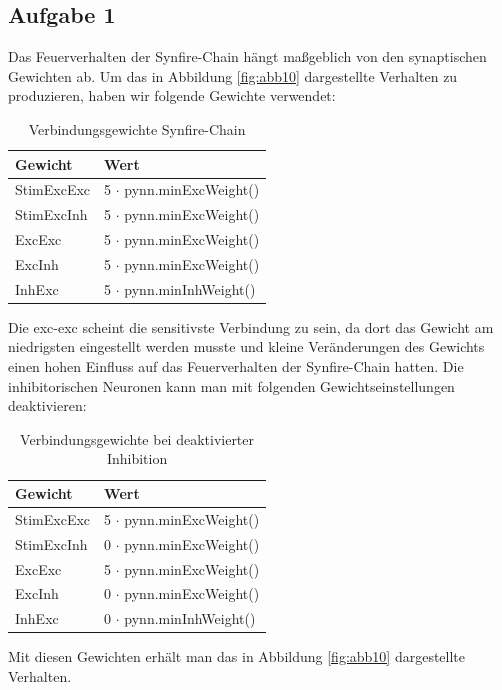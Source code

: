 \documentclass[10pt,a4paper]{scrartcl}
\begin{document}
\subsection{Aufgabe 1}
Das Feuerverhalten der Synfire-Chain hängt maßgeblich von den synaptischen Gewichten ab. Um das in Abbildung \ref{fig:abb10} dargestellte Verhalten zu produzieren, haben wir folgende Gewichte verwendet:

\begin{table}[H]
\centering
\captionsetup{justification=centering}
\caption{Verbindungsgewichte Synfire-Chain}
\begin{tabular}{l|l}
 Gewicht&Wert\\
\hline
StimExcExc&5 $\cdot$ pynn.minExcWeight()\\
StimExcInh&5 $\cdot$ pynn.minExcWeight()\\
ExcExc&5 $\cdot$ pynn.minExcWeight()\\
ExcInh&5 $\cdot$ pynn.minExcWeight()\\
InhExc&5 $\cdot$ pynn.minInhWeight()
\end{tabular}
\label{tab:05}
\end{table}

\noindent Die exc-exc scheint die sensitivste Verbindung zu sein, da dort das Gewicht am niedrigsten eingestellt werden musste und kleine Veränderungen des Gewichts einen hohen Einfluss auf das Feuerverhalten der Synfire-Chain hatten. Die inhibitorischen Neuronen kann man mit folgenden Gewichtseinstellungen deaktivieren:

\begin{table}[H]
\centering
\captionsetup{justification=centering}
\caption{Verbindungsgewichte bei deaktivierter Inhibition}
\begin{tabular}{l|l}
 Gewicht&Wert\\
\hline
StimExcExc&5 $\cdot$ pynn.minExcWeight()\\
StimExcInh&0 $\cdot$ pynn.minExcWeight()\\
ExcExc&5 $\cdot$ pynn.minExcWeight()\\
ExcInh&0 $\cdot$ pynn.minExcWeight()\\
InhExc&0 $\cdot$ pynn.minInhWeight()
\end{tabular}
\label{tab:06}
\end{table}

\noindent Mit diesen Gewichten erhält man das in Abbildung \ref{fig:abb10} dargestellte Verhalten.
\end{document}
